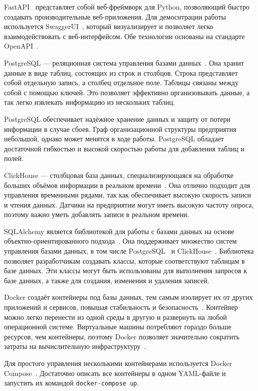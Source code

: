 FastAPI~\cite{FastAPI} представляет собой веб-фреймворк для Python, позволяющий быстро создавать производительные веб-приложения. Для демоснтрации работы используется SwaggerUI~\cite{swaggerui}, который визуализирует и позволяет легко взаимодействовать с веб-интерфейсом. Обе технологии основаны на стандарте OpenAPI~\cite{OpenAPI}.

PostgreSQL --- реляционная система управления базами данных~\cite{postgresql}. Она хранит данные в виде таблиц, состоящих из строк и столбцов. Строка представляет собой отдельную запись, а столбец отдельное поле. Таблицы связаны между собой с помощью ключей. Это позволяет эффективно организовывать данные, а так легко извлекать информацию из нескольких таблиц.

PostgreSQL обеспечивает надёжное хранение данных и защиту от потери информации в случае сбоев. Граф организационной структуры предприятия небольшой, однако может менятся в ходе работы. PostgreSQL обладает достаточной гибкостью и высокой скоростью работы для добавления таблиц и полей.

ClickHouse --- столбцовая база данных, специализирующаяся на обработке больших объёмов информации в реальном времени~\cite{clickhouse}. Она отлично подходит для управления временными рядами, так как обеспечивает высокую скорость записи и чтения данных. Датчики на предприятии могут иметь высокую частоту опроса, поэтому важно уметь добавлять записи в реальном времени.

SQLAlchemy является библиотекой для работы с базами данных на основе объектно-ориентированного подхода~\cite{SQLAlchemy}. Она поддерживает множество систем управления базами данных, в том числе PostgreSQL~\cite{SQLAlchemy-pg} и ClickHouse~\cite{SQLAlchemy-ch}. Библиотека позволяет разработчикам создавать классы, которые соответствуют таблицам в базе данных. Эти классы могут быть использованы для выполнения запросов к базе данных, а также для создания, изменения и удаления записей.

Docker создаёт контейнеры под базы данных, тем самым изолирует их от других приложений и сервисов, повышая стабильность и безопасность~\cite{Docker}. Контейнер можно легко перенести из одной среды в другую и развернуть на любой операционной системе. Виртуальные машины потребляют гораздо больше ресурсов, чем контейнеры, поэтому Docker позволяет значительно сократить затраты на вычислительную инфраструктуру~\cite{Habr-VM}.

Для простого управления несколькими контейнерами используется Docker Compose~\cite{Docker-Compose}. Достаточно описать все контейнеры в одном YAML-файле и запустить их командой \texttt{docker-compose up}.

